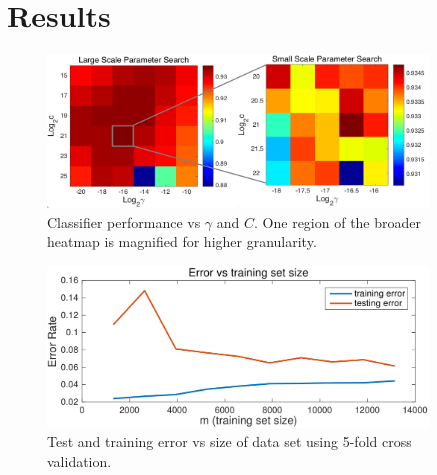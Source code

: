 \documentclass[12pt]{article}
\begin{document}
\section{Results}

\begin{figure}
\begin{center}
\includegraphics[width=0.9\textwidth]{figures/paramSearch}
\end{center}
\caption{Classifier performance vs $\gamma$ and $C$. One region of the broader heatmap is magnified for higher granularity.}
\label{paramSearch}
\end{figure}

\begin{figure}
\begin{center}
\includegraphics[width=0.9\textwidth]{figures/error}
\end{center}
\caption{Test and training error vs size of data set using 5-fold cross validation.}
\label{error}
\end{figure}


\end{document}
